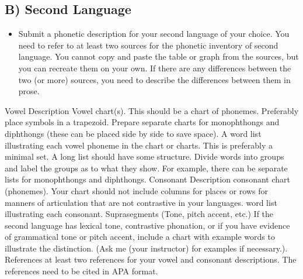 \documentclass[12pt]{article}
\begin{document}
\subsection*{B) Second Language}
\begin{itemize}
  \item Submit a phonetic description for your second language of your choice. You need to refer to at least two sources for the phonetic inventory of second language. You cannot copy and paste the table or graph from the sources, but you can recreate them on your own. If there are any differences between the two (or more) sources, you need to describe the differences between them in prose.
\end{itemize}
Vowel Description
Vowel chart(s). This should be a chart of phonemes. Preferably place symbols in a trapezoid. Prepare separate charts for monophthongs and diphthongs (these can be placed side by side to save space).
A word list illustrating each vowel phoneme in the chart or charts. This is preferably a minimal set. A long list should have some structure. Divide words into groups and label the groups as to what they show. For example, there can be separate lists for monophthongs and diphthongs.
Consonant Description
consonant chart (phonemes). Your chart should not include columns for places or rows for manners of articulation that are not contrastive in your languages.
word list illustrating each consonant.
Suprasegments (Tone, pitch accent, etc.)
If the second language has lexical tone, contrastive phonation, or if you have evidence of grammatical tone or pitch accent, include a chart with example words to illustrate the distinction.  (Ask me (your instructor) for examples if necessary.).
References
at least two references for your vowel and consonant descriptions. The references need to be cited in APA format.
\end{document}
